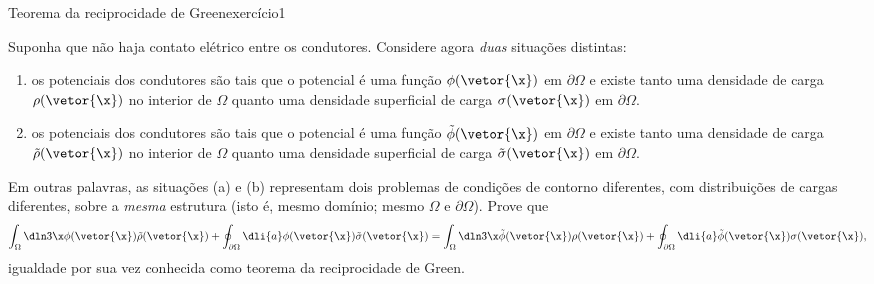 \begin{exercício}{Teorema da reciprocidade de Green}{exercício1}
\begin{center}
    \end{center}
    Suponha que não haja contato elétrico entre os condutores. Considere agora \emph{duas} situações distintas:
    \begin{enumerate}[label=(\alph*)]
        \item os potenciais dos condutores são tais que o potencial é uma função \(\phi(\vetor{\x})\) em \(\partial \Omega\) e existe tanto uma densidade de carga \(\rho(\vetor{\x})\) no interior de \(\Omega\) quanto uma densidade superficial de carga \(\sigma(\vetor{\x})\) em \(\partial \Omega\).
        \item os potenciais dos condutores são tais que o potencial é uma função \(\tilde{\phi}(\vetor{\x})\) em \(\partial \Omega\) e existe tanto uma densidade de carga \(\tilde{\rho}(\vetor{\x})\) no interior de \(\Omega\) quanto uma densidade superficial de carga \(\tilde{\sigma}(\vetor{\x})\) em \(\partial \Omega\).
    \end{enumerate}
    Em outras palavras, as situações (a) e (b) representam dois problemas de condições de contorno diferentes, com distribuições de cargas diferentes, sobre a \emph{mesma} estrutura (isto é, mesmo domínio; mesmo \(\Omega\) e \(\partial \Omega\)). Prove que
    \begin{equation*}
        \int_{\Omega}\dln3\x \phi(\vetor{\x}) \tilde{\rho}(\vetor{\x}) + \oint_{\partial \Omega}\dli{a} \phi(\vetor{\x})\tilde{\sigma}(\vetor{\x}) = \int_{\Omega}\dln3\x \tilde{\phi}(\vetor{\x})\rho(\vetor{\x}) + \oint_{\partial \Omega} \dli{a} \tilde{\phi}(\vetor{\x})\sigma(\vetor{\x}),
    \end{equation*}
    igualdade por sua vez conhecida como teorema da reciprocidade de Green.
\end{exercício}
